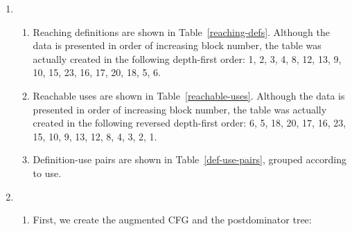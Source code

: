 \documentclass{article}
\begin{document}
\begin{enumerate}
  \item
    \begin{enumerate}
      \item Reaching definitions are shown in Table~\ref{reaching-defs}.
        Although the data is
        presented in order of increasing block number, the table was
        actually created in the following depth-first order:
        1, 2, 3, 4, 8, 12, 13, 9, 10, 15, 23, 16, 17, 20, 18, 5, 6.

      \item Reachable uses are shown in Table~\ref{reachable-uses}.
        Although the data is presented in order of increasing block
        number, the table was actually created in the following
        reversed depth-first order:
        6, 5, 18, 20, 17, 16, 23, 15, 10, 9, 13, 12, 8, 4, 3, 2, 1.

      \item Definition-use pairs are shown in
        Table~\ref{def-use-pairs}, grouped according to use.
    \end{enumerate}

  \item
    \begin{enumerate}
      \item First, we create the augmented CFG and the postdominator
        tree:

        \begin{minipage}[t]{\linewidth}
          \begin{minipage}[t]{.5\linewidth}
            \centering
            \begin{minipage}[t]{.9\linewidth}
              \begin{center}
\end{center}
\end{minipage}
\end{minipage}
\end{minipage}
\end{enumerate}
\end{enumerate}
\end{document}
